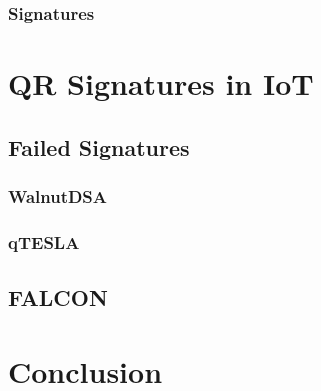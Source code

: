\documentclass[conference]{IEEEtran}
\begin{document}
\subsubsection{Signatures}

\section{QR Signatures in IoT}
\subsection{Failed Signatures}
\subsubsection{WalnutDSA}
\subsubsection{qTESLA}
\subsection{FALCON}

\section{Conclusion}



\end{document}
